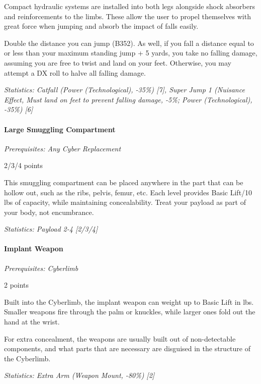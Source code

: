 \begin{multicols*}{3}
	Compact hydraulic systems are installed into both legs alongside shock absorbers and reinforcements to the limbs. These  allow the user to propel themselves with great force when jumping and absorb the impact of falls easily.
	
	Double the distance you can jump (B352). As well, if you fall a distance equal to or less than your maximum standing jump + 5 yards, you take no falling damage, assuming you are free to twist and land on your feet. Otherwise, you may attempt a DX roll to halve all falling damage.
	
	\textit{\textcolor{OliveGreen}{Statistics: Catfall (Power (Technological), -35\%) [7], Super Jump 1 (Nuisance Effect, Must land on feet to prevent falling damage, -5\%; Power (Technological), -35\%) [6]}}
	
	\paragraph{Large Smuggling Compartment}
	\textit{Prerequisites: Any Cyber Replacement}
	\begin{flushright}
		2/3/4 points
	\end{flushright}
	
	This smuggling compartment can be placed anywhere in the part that can be hollow out, such as the ribs, pelvis, femur, etc. Each level provides Basic Lift/10 lbs of capacity, while maintaining concealability. Treat your payload as part of your body, not encumbrance. 
	
	\textit{\textcolor{OliveGreen}{Statistics: Payload 2-4 [2/3/4]}}
	
	\paragraph{Implant Weapon}
	\textit{Prerequisites: Cyberlimb}
	\begin{flushright}
		2 points
	\end{flushright}
	
	Built into the Cyberlimb, the implant weapon can weight up to Basic Lift in lbs. Smaller weapons fire through the palm or knuckles, while larger ones fold out the hand at the wrist.
	
	For extra concealment, the weapons are usually built out of non-detectable components, and what parts that are necessary are disguised in the structure of the Cyberlimb. 
	
	\textit{\textcolor{OliveGreen}{Statistics: Extra Arm (Weapon Mount, -80\%) [2]}}
	

\end{multicols*}
